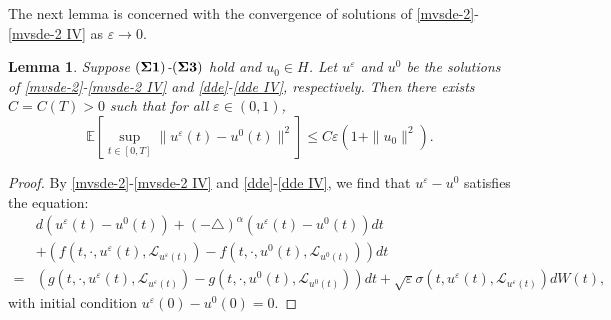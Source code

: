 \documentclass[11pt]{article}
\numberwithin{equation}{section}
\theoremstyle{plain}
\newtheorem{lemma}{Lemma}[section]
\def\leq{\leqslant}
\begin{document}
 The next lemma is
 concerned with the convergence of
 solutions of \eqref{mvsde-2}-\eqref{mvsde-2 IV}
 as $\varepsilon \to 0$.





 \begin{lemma} \label{sdc}
    Suppose  $({\bf \Sigma 1})$-$({\bf \Sigma 3})$ hold
    and $u_0\in H$.
    Let $u^\varepsilon$
    and $u^0$ be the solutions
    of
    \eqref{mvsde-2}-\eqref{mvsde-2 IV} and \eqref{dde}-\eqref{dde IV},
    respectively.
    Then
    there exists   $C=C(T)>0$
    such that for all
    $\varepsilon \in (0,1)$,
    $$ \mathbb{E} \left[ \sup_{t \in [0,T]} \| u^\varepsilon(t) - u^0 (t) \|^2 \right]
    \leq C \varepsilon \left( 1 + \| u_0 \|^2
    \right).
    $$
 \end{lemma}
 \begin{proof}

    By \eqref{mvsde-2}-\eqref{mvsde-2 IV} and \eqref{dde}-\eqref{dde IV},
    we find that
    $u^\varepsilon  - u^0
    $ satisfies the   equation:
    \begin{align} \label{difference-1}
        & d \left( u^\varepsilon(t) - u^0 (t) \right)
        + (-\triangle)^\alpha \left( u^\varepsilon(t) - u^0 (t) \right) dt
        \nonumber \\
        &  + \left( f(t, \cdot,  u^\varepsilon(t), \mathcal{L}_{u^\varepsilon (t)} )
        - f(t, \cdot,  u^0(t), \mathcal{L}_{u^0(t)} )
        \right) dt
        \nonumber \\
        = & \left( g(t, \cdot, u^\varepsilon(t), \mathcal{L}_{u^\varepsilon (t)} )
        - g(t, \cdot, u^0(t), \mathcal{L}_{u^0(t)} )
        \right) dt
        + \sqrt{\varepsilon}
        \sigma(t, u^\varepsilon (t), \mathcal{L}_{u^\varepsilon (t)} ) dW(t),
    \end{align}
    with initial condition $u^\varepsilon(0) - u^0(0) = 0$.


\end{proof}
\end{document}
